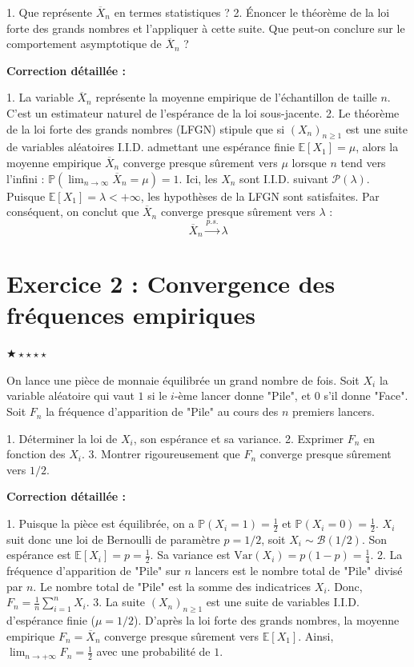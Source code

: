 \documentclass[11pt,a4paper]{article}
\begin{document}
1. Que représente $\overline{X}_n$ en termes statistiques ?
2. Énoncer le théorème de la loi forte des grands nombres et l'appliquer à cette suite. Que peut-on conclure sur le comportement asymptotique de $\overline{X}_n$ ?

\textbf{Correction détaillée :}

1. La variable $\overline{X}_n$ représente la moyenne empirique de l'échantillon de taille $n$. C'est un estimateur naturel de l'espérance de la loi sous-jacente.
2. Le théorème de la loi forte des grands nombres (LFGN) stipule que si $(X_n)_{n \geq 1}$ est une suite de variables aléatoires I.I.D. admettant une espérance finie $\mathbb{E}[X_1] = \mu$, alors la moyenne empirique $\overline{X}_n$ converge presque sûrement vers $\mu$ lorsque $n$ tend vers l'infini : $\mathbb{P}\left(\lim_{n \to \infty} \overline{X}_n = \mu\right) = 1$.
   Ici, les $X_n$ sont I.I.D. suivant $\mathcal{P}(\lambda)$. Puisque $\mathbb{E}[X_1] = \lambda < +\infty$, les hypothèses de la LFGN sont satisfaites.
   Par conséquent, on conclut que $\overline{X}_n$ converge presque sûrement vers $\lambda$ :
   $$ \overline{X}_n \xrightarrow{p.s.} \lambda $$


\section*{Exercice 2 : Convergence des fréquences empiriques}

$\bigstar\star\star\star\star$

On lance une pièce de monnaie équilibrée un grand nombre de fois.
Soit $X_i$ la variable aléatoire qui vaut $1$ si le $i$-ème lancer donne "Pile", et $0$ s'il donne "Face".
Soit $F_n$ la fréquence d'apparition de "Pile" au cours des $n$ premiers lancers.

1. Déterminer la loi de $X_i$, son espérance et sa variance.
2. Exprimer $F_n$ en fonction des $X_i$.
3. Montrer rigoureusement que $F_n$ converge presque sûrement vers $1/2$.

\textbf{Correction détaillée :}

1. Puisque la pièce est équilibrée, on a $\mathbb{P}(X_i = 1) = \frac{1}{2}$ et $\mathbb{P}(X_i = 0) = \frac{1}{2}$.
   $X_i$ suit donc une loi de Bernoulli de paramètre $p = 1/2$, soit $X_i \sim \mathcal{B}(1/2)$.
   Son espérance est $\mathbb{E}[X_i] = p = \frac{1}{2}$.
   Sa variance est $\text{Var}(X_i) = p(1-p) = \frac{1}{4}$.
2. La fréquence d'apparition de "Pile" sur $n$ lancers est le nombre total de "Pile" divisé par $n$.
   Le nombre total de "Pile" est la somme des indicatrices $X_i$.
   Donc, $F_n = \frac{1}{n} \sum_{i=1}^n X_i$.
3. La suite $(X_n)_{n \geq 1}$ est une suite de variables I.I.D. d'espérance finie ($\mu = 1/2$).
   D'après la loi forte des grands nombres, la moyenne empirique $F_n = \overline{X}_n$ converge presque sûrement vers $\mathbb{E}[X_1]$.
   Ainsi, $\lim_{n \to +\infty} F_n = \frac{1}{2}$ avec une probabilité de $1$.
\end{document}
